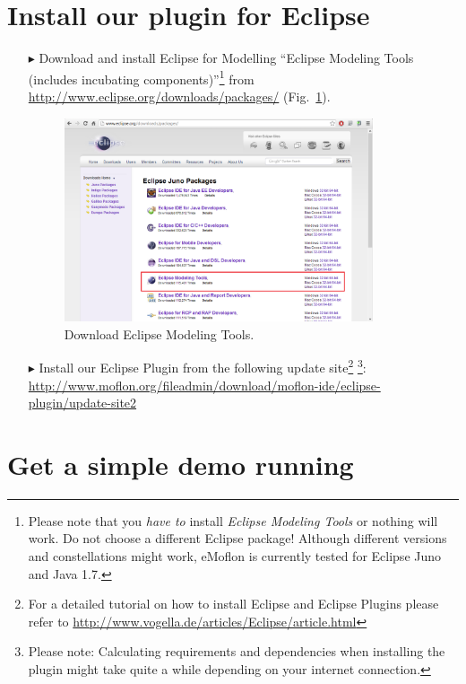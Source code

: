 \section{Install our plugin for Eclipse}
\begin{enumerate}
\item[$\blacktriangleright$] Download and install Eclipse for Modelling ``Eclipse Modeling Tools (includes incubating components)''\footnote{Please note that you \emph{have to} install \emph{Eclipse Modeling Tools} or nothing will work.  Do not choose a different Eclipse package!  Although different versions and constellations might work, eMoflon is currently tested for Eclipse Juno and Java 1.7.} from \url{http://www.eclipse.org/downloads/packages/} (Fig.~\ref{fig_downloadModelingPackage}).

\begin{figure}[htbp]
	\centering
  	\includegraphics[width=0.86\textwidth]{pics/installationAndSetup/eclipse_modelingpackage.png}
	\caption{Download Eclipse Modeling Tools.}
	\label{fig_downloadModelingPackage}
\end{figure}

\item[$\blacktriangleright$] Install our Eclipse Plugin from the following update site\footnote{For a detailed tutorial on how to install Eclipse and Eclipse Plugins please refer to \url{http://www.vogella.de/articles/Eclipse/article.html}} 
\footnote{Please note: Calculating requirements and dependencies when installing the plugin might take quite a while depending on your internet connection.}:
\url{http://www.moflon.org/fileadmin/download/moflon-ide/eclipse-plugin/update-site2}
\end{enumerate}

\section{Get a simple demo running}

